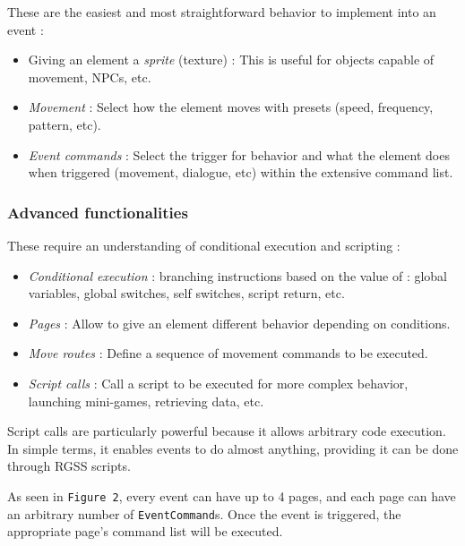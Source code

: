 \documentclass[11pt]{article}
\begin{document}
{These are the easiest and most straightforward behavior to implement into an event :

\begin{itemize}
	\item Giving an element a \textit{sprite} (texture) : This is useful for objects capable of movement, NPCs, etc.
	
	\item \textit{Movement} : Select how the element moves with presets (speed, frequency, pattern, etc).
	
	\item \textit{Event commands} : Select the trigger for behavior and what the element does when triggered (movement, dialogue, etc) within the extensive command list.
\end{itemize}

\subsubsection{Advanced functionalities}

These require an understanding of conditional execution and scripting :

\begin{itemize}
	\item \textit{Conditional execution} : branching instructions based on the value of : global variables, global switches, self switches, script return, etc.
	
	\item \textit{Pages} : Allow to give an element different behavior depending on conditions.
	
	\item \textit{Move routes} : Define a sequence of movement commands to be executed.
	
	\item \textit{Script calls} : Call a script to be executed for more complex behavior, launching mini-games, retrieving data, etc.
\end{itemize}

Script calls are particularly powerful because it allows arbitrary code execution. In simple terms, it enables events to do almost anything, providing it can be done through RGSS scripts.

As seen in \texttt{Figure 2}, every event can have up to 4 pages, and each page can have an arbitrary number of \texttt{EventCommand}s. Once the event is triggered, the appropriate page's command list will be executed.

}
\end{document}

